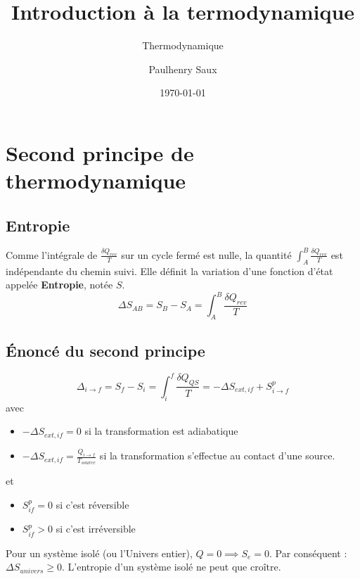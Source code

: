 \documentclass[french]{yLectureNote}
\title{Introduction à la termodynamique}
\subtitle{Thermodynamique}
\author{Paulhenry Saux}
\date{\today}
\begin{document}
\setcounter{chapter}{3}
\chapter{Second principe de thermodynamique}

\section{Entropie}

\begin{theorem}
    Comme l'intégrale de $\frac{\delta Q_{rev}}{T}$ sur un cycle fermé est nulle, la quantité $\int_A^B \frac{\delta Q_{rev}}{T}$ est indépendante du chemin suivi. Elle définit la variation d'une fonction d'état appelée \textbf{Entropie}, notée $S$.
    $$\Delta S_{AB} = S_B - S_A = \int_A^B \frac{\delta Q_{rev}}{T}$$
\end{theorem}

\section{Énoncé du second principe}
\begin{theorem}
    $$\Delta_{i\to f} = S_f-S_i = \int_i^f \frac{\delta Q_{QS}}{T} = -\Delta S_{ext, if}+S^p_{i\to f}$$
    avec 
    \begin{itemize}
        \item $-\Delta S_{ext,if} = 0$ si la transformation est adiabatique
        \item $-\Delta S_{ext,if} = \frac{Q_{i\to f}}{T_{source}}$ si la transformation s'effectue au contact d'une source.
    \end{itemize}
      et
      \begin{itemize}
        \item $S^p_{if}=0$ si c'est réversible
        \item $S^p_{if}>0$ si c'est irréversible
      \end{itemize}
\end{theorem}

\begin{theorem}
    Pour un système isolé (ou l'Univers entier), $Q=0 \implies S_e = 0$.
    Par conséquent : $\Delta S_{univers} \geq 0$.
    L'entropie d'un système isolé ne peut que croître.
\end{theorem}
\end{document}
